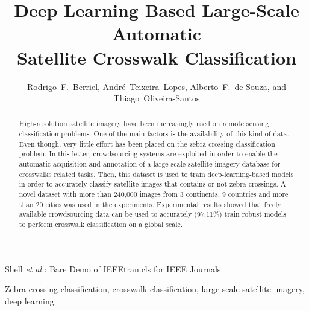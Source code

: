 \documentclass[journal]{IEEEtran}
\newcommand{\IEEECopyrightMessage}{\copyright~2017 IEEE. Personal use of this material is permitted. Permission from IEEE must be obtained for all other uses, in any current or future media, including reprinting/republishing this material for advertising or promotional purposes, creating new collective works, for resale or redistribution to servers or lists, or reuse of any copyrighted component of this work in other works.\xspace}
\begin{document}
	
\title{Deep Learning Based Large-Scale Automatic\\Satellite Crosswalk Classification}

\author{
	Rodrigo~F.~Berriel,
	André~Teixeira~Lopes,
	Alberto~F.~de Souza,
	and Thiago~Oliveira-Santos%
}

\markboth{}%
{Shell \MakeLowercase{\textit{et al.}}: Bare Demo of IEEEtran.cls for IEEE Journals}

\maketitle

\makeatletter
\def\ps@IEEEtitlepagestyle{
	\def\@oddfoot{\mycopyrightnotice}
	\def\@evenfoot{}
}
\def\mycopyrightnotice{
	{\footnotesize
		\begin{minipage}{\textwidth}
			\centering
			\scriptsize
			\IEEECopyrightMessage
		\end{minipage}
	}
}
\newcommand\copyrightnotice{%
	\begin{tikzpicture}[remember picture,overlay]
	\node[anchor=south,yshift=10pt] at (current page.south) {\fbox{\parbox{\dimexpr\textwidth-\fboxsep-\fboxrule\relax}{\copyrighttext}}};
	\end{tikzpicture}%
}

\begin{abstract}
	High-resolution satellite imagery have been increasingly used on remote sensing classification problems. One of the main factors is the availability of this kind of data. Even though, very little effort has been placed on the zebra crossing classification problem. In this letter, crowdsourcing systems are exploited in order to enable the automatic acquisition and annotation of a large-scale satellite imagery database for crosswalks related tasks. Then, this dataset is used to train deep-learning-based models in order to accurately classify satellite images that contains or not zebra crossings. A novel dataset with more than 240,000 images from 3 continents, 9 countries and more than 20 cities was used in the experiments. Experimental results showed that freely available crowdsourcing data can be used to accurately (97.11\%) train robust models to perform crosswalk classification on a global scale.
\end{abstract}

\begin{IEEEkeywords}
	Zebra crossing classification, crosswalk classification, large-scale satellite imagery, deep learning
\end{IEEEkeywords}
\end{document}
